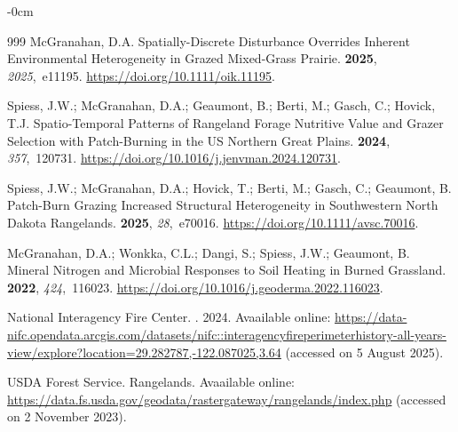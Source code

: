 \documentclass[fire,article,accept,oneauthor,pdftex]{Definitions/mdpi}
\begin{document}
\begin{adjustwidth}{-\extralength}{0cm}
\begin{thebibliography}{999}
McGranahan, D.A.
\newblock Spatially-Discrete Disturbance Overrides Inherent Environmental
  Heterogeneity in Grazed Mixed-Grass Prairie.
 {\bf 2025}, {\em 2025},~e11195.
\newblock
  \url{https://doi.org/10.1111/oik.11195}.

Spiess, J.W.; McGranahan, D.A.; Geaumont, B.; Berti, M.; Gasch, C.; Hovick,
  T.J.
\newblock Spatio-Temporal Patterns of Rangeland Forage Nutritive Value and
  Grazer Selection with Patch-Burning in the {{US}} Northern {{Great Plains}}.
 {\bf 2024}, {\em
  357},~120731.
\newblock
  \url{https://doi.org/10.1016/j.jenvman.2024.120731}.

Spiess, J.W.; McGranahan, D.A.; Hovick, T.; Berti, M.; Gasch, C.; Geaumont, B.
\newblock Patch-{{Burn Grazing Increased Structural Heterogeneity}} in
  {{Southwestern North Dakota Rangelands}}.
 {\bf 2025}, {\em 28},~e70016.
\newblock
  \url{https://doi.org/10.1111/avsc.70016}.

McGranahan, D.A.; Wonkka, C.L.; Dangi, S.; Spiess, J.W.; Geaumont, B.
\newblock Mineral Nitrogen and Microbial Responses to Soil Heating in Burned
  Grassland.
 {\bf 2022}, {\em 424},~116023.
\newblock
  \url{https://doi.org/10.1016/j.geoderma.2022.116023}.

{National Interagency Fire Center}.
.  2024.
\newblock
  Avaailable online: \url{https://data-nifc.opendata.arcgis.com/datasets/nifc::interagencyfireperimeterhistory-all-years-view/explore?location=29.282787,-122.087025,3.64} (accessed on 5 August 2025).
 

{USDA Forest Service}.
\newblock Rangelands.
\newblock Avaailable online: \url{https://data.fs.usda.gov/geodata/rastergateway/rangelands/index.php} (accessed on 2 November 2023).



\end{thebibliography}
\end{adjustwidth}
\end{document}
